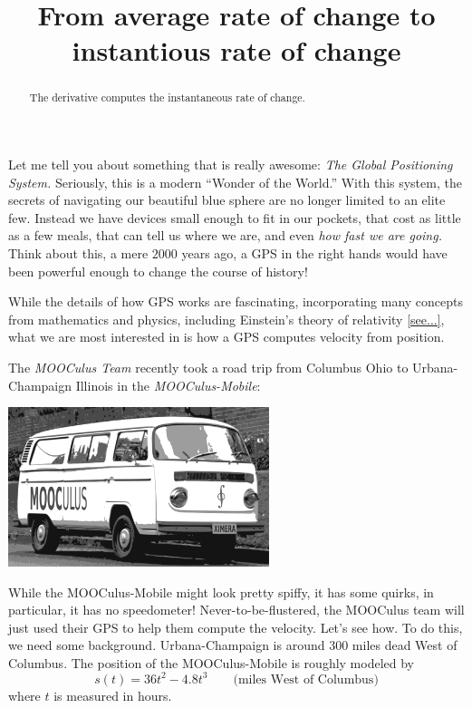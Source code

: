 \documentclass{ximera}
\title{From average rate of change to instantious rate of change}
\begin{document}
\begin{abstract}
The derivative computes the instantaneous rate of change. 
\end{abstract}
\maketitle



Let me tell you about something that is really awesome: \textit{The
  Global Positioning System.} Seriously, this is a modern ``Wonder of
the World.'' With this system, the secrets of navigating our beautiful
blue sphere are no longer limited to an elite few. Instead we have
devices small enough to fit in our pockets, that cost as little as a
few meals, that can tell us where we are, and even \textit{how fast we
  are going.} Think about this, a mere $2000$ years ago, a GPS in the
right hands would have been powerful enough to change the course of
history!

While the details of how GPS works are fascinating, incorporating many
concepts from mathematics and physics, including Einstein's theory of
relativity \ref{see...}, what we are most interested in is how a GPS
computes velocity from position.

The \textit{MOOCulus Team} recently took a road trip from Columbus
Ohio to Urbana-Champaign Illinois in the \textit{MOOCulus-Mobile}:
\begin{image}
\includegraphics[width=3in]{mooculusMobile.pdf}
\end{image}
While the MOOCulus-Mobile might look pretty spiffy, it has some
quirks, in particular, it has no speedometer!  Never-to-be-flustered,
the MOOCulus team will just used their GPS to help them compute the
velocity. Let's see how. To do this, we need some
background. Urbana-Champaign is around $300$ miles dead West of
Columbus. The position of the MOOCulus-Mobile is roughly modeled by
\[
s(t) = 36t^2 -4.8t^3 \qquad\text{(miles West of Columbus)}
\]
where $t$ is measured in hours. 
\end{document}
